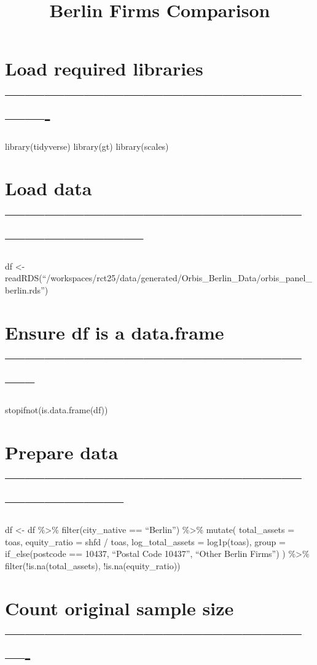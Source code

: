 \documentclass[
]{article}
\title{Berlin Firms Comparison}
\author{}
\date{\vspace{-2.5em}}
\begin{document}
\maketitle

\hypertarget{load-required-libraries--}{%
\section{Load required libraries
----------------------------------------------------}\label{load-required-libraries--}}

library(tidyverse) library(gt) library(scales)

\hypertarget{load-data}{%
\section{Load data
------------------------------------------------------------------}\label{load-data}}

df \textless-
readRDS(``/workspaces/rct25/data/generated/Orbis\_Berlin\_Data/orbis\_panel\_berlin.rds'')

\hypertarget{ensure-df-is-a-data.frame}{%
\section{Ensure df is a data.frame
--------------------------------------------------}\label{ensure-df-is-a-data.frame}}

stopifnot(is.data.frame(df))

\hypertarget{prepare-data}{%
\section{Prepare data
---------------------------------------------------------------}\label{prepare-data}}

df \textless- df \%\textgreater\% filter(city\_native == ``Berlin'')
\%\textgreater\% mutate( total\_assets = toas, equity\_ratio = shfd /
toas, log\_total\_assets = log1p(toas), group = if\_else(postcode ==
10437, ``Postal Code 10437'', ``Other Berlin Firms'') ) \%\textgreater\%
filter(!is.na(total\_assets), !is.na(equity\_ratio))

\hypertarget{count-original-sample-size--}{%
\section{Count original sample size
-------------------------------------------------}\label{count-original-sample-size--}}
\end{document}
